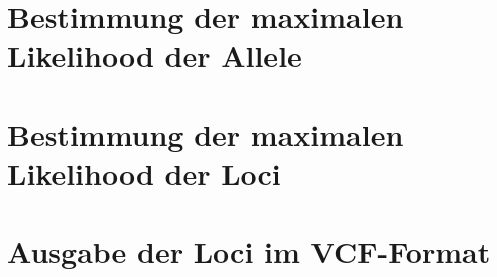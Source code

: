 \section{Bestimmung der maximalen Likelihood der Allele} \label{sec:}
\subsection{} \label{subsec:}


\section{Bestimmung der maximalen Likelihood der Loci} \label{sec:}
\subsection{} \label{subsec:}


\section{Ausgabe der Loci im VCF-Format} \label{sec:}
\subsection{} \label{subsec:}
